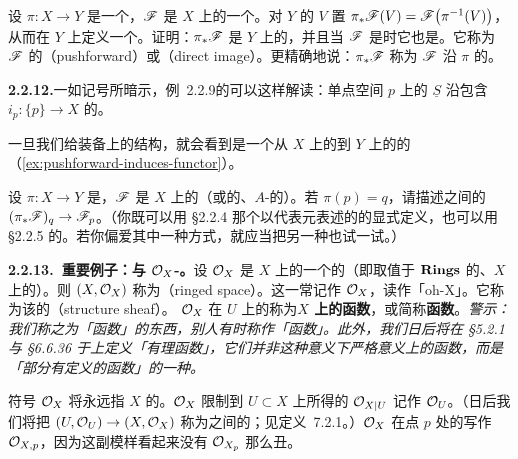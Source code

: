 \begin{exercise}\label{ex:pushforward-sheaf}
设 $\pi\colon X\to Y$ 是一个\trContinuousMap{}，$\mathscr{F}$ 是 $X$ 上的一个\trPresheaf。对 $Y$ 的\trOpenSubset{} $V$ 置 $\pi_*\mathscr{F}(V)=\mathscr{F}\bigl(\pi^{-1}(V)\bigr)$，从而在 $Y$ 上定义一个\trPresheaf。证明：$\pi_*\mathscr{F}$ 是 $Y$ 上的\trPresheaf，并且当 $\mathscr{F}$ 是\trSheaf{}时它也是\trSheaf。它称为 $\mathscr{F}$ 的\textbf{\trPushforward}（pushforward）或\textbf{\trDirectImage}（direct image）。更精确地说：$\pi_*\mathscr{F}$ 称为 $\mathscr{F}$ 沿 $\pi$ 的\textbf{\trPushforward}。
\end{exercise}

\textbf{2.2.12.}\quad 一如记号所暗示，\mbox{例~2.2.9}的\trSkyscraperSheaf{}可以这样解读：单点空间 $p$ 上的\trConstantSheaf{} $\underline{S}$ 沿包含\trMorphism{} $i_p\colon\{p\}\to X$ 的\trPushforward。

一旦我们给\trSheaf{}装备上\trCategory{}的结构，就会看到\trPushforward{}是一个从 $X$ 上的\trSheaf{}到 $Y$ 上的\trSheaf{}的\trFunctor{}（\cref{ex:pushforward-induces-functor}）。

\begin{exercise}\label{ex:pushforward-stalks}
设 $\pi\colon X\to Y$ 是\trContinuousMap{}，$\mathscr{F}$ 是 $X$ 上的\trSetsWord\trSheaf{}（或\trRing{}的、$A$-\trModule{}的\trSheaf）。若 $\pi(p)=q$，请描述\trStalk{}之间的\trNatural\trMorphism{} $(\pi_*\mathscr{F})_q\to\mathscr{F}_p$。（你既可以用 \S2.2.4 那个以代表元表述的\trStalk{}的显式定义，也可以用 \S2.2.5 的\trUniversalProperty。若你偏爱其中一种方式，就应当把另一种也试一试。）
\end{exercise}

\textbf{2.2.13.\ 重要例子：\trRingedSpace{}与 $\mathcal{O}_X$-\trModule。}\quad 设 $\mathcal{O}_X$ 是\trTopologicalSpace{} $X$ 上的一个\trRing{}的\trSheaf{}（即取值于\trCategory{} $\mathbf{Rings}$ 的、$X$ 上的\trSheaf）。则 $(X,\mathcal{O}_X)$ 称为\textbf{\trRingedSpace}（ringed space）。这一\trRing\trSheaf{}常记作 $\mathcal{O}_X$，读作「oh-X」。它称为该\trRingedSpace{}的\textbf{\trStructureSheaf}（structure sheaf）。\trStructureSheaf{} $\mathcal{O}_X$ 在\trOpenSubset{} $U$ 上的\trSection{}称为\textbf{$X$ 上的函数}，或简称\textbf{函数}。\emph{警示：我们称之为「函数」的东西，别人有时称作「\trRegular{}函数」。此外，我们日后将在 \S5.2.1 与 \S6.6.36 于\trScheme{}上定义「有理函数」，它们并非这种意义下严格意义上的函数，而是「部分有定义的函数」的一种。}

符号 $\mathcal{O}_X$ 将永远指\trRingedSpace{} $X$ 的\trStructureSheaf。$\mathcal{O}_X$ 限制到\trOpenSubset{} $U\subset X$ 上所得的 $\mathcal{O}_{X|U}$ 记作 $\mathcal{O}_U$。（日后我们将把 $(U,\mathcal{O}_U)\to(X,\mathcal{O}_X)$ 称为\trRingedSpace{}之间的\emph{\trOpenEmbedding}；见\mbox{定义~7.2.1}。）$\mathcal{O}_X$ 在点 $p$ 处的\trStalk{}写作 $\mathcal{O}_{X,p}$，因为这副模样看起来没有 $\mathcal{O}_{X_p}$ 那么丑。

